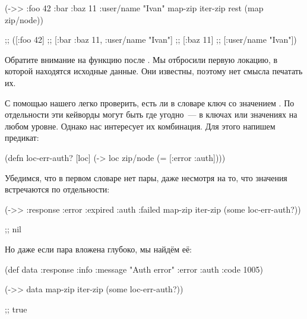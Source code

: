 \else

\begin{english}
  \begin{clojure}
(->> {:foo 42
      :bar {:baz 11
            :user/name "Ivan"}}
     map-zip
     iter-zip
     rest
     (map zip/node))

;; ([:foo 42]
;;  [:bar {:baz 11, :user/name "Ivan"}]
;;  [:baz 11]
;;  [:user/name "Ivan"])
  \end{clojure}
\end{english}

\fi

Обратите внимание на функцию  после  . Мы
отбросили первую локацию, в которой находятся исходные данные. Они известны,
поэтому нет смысла печатать их.

С помощью нашего  легко проверить, есть ли в словаре ключ
 со значением . По отдельности эти кейворды могут быть
где угодно~--- в ключах или значениях на любом уровне. Однако нас интересует их
комбинация. Для этого напишем предикат:

\begin{english}
  \begin{clojure}
(defn loc-err-auth? [loc]
  (-> loc zip/node (= [:error :auth])))
  \end{clojure}
\end{english}

Убедимся, что в первом словаре нет пары, даже несмотря на то, что значения
встречаются по отдельности:

\begin{english}
  \begin{clojure}
(->> {:response {:error :expired
                 :auth :failed}}
     map-zip
     iter-zip
     (some loc-err-auth?))

;; nil
  \end{clojure}
\end{english}

Но даже если пара вложена глубоко, мы найдём её:

\begin{english}
  \begin{clojure}
(def data
  {:response {:info {:message "Auth error"
                     :error :auth
                     :code 1005}}})

(->> data
     map-zip
     iter-zip
     (some loc-err-auth?))

;; true
  \end{clojure}
\end{english}

